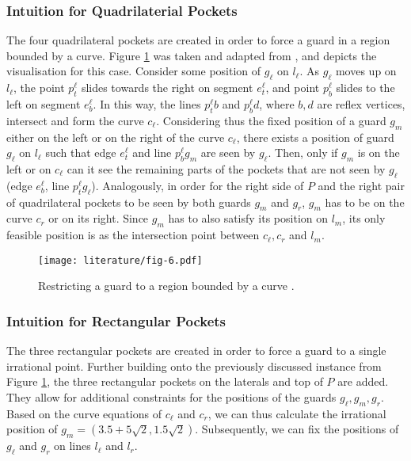\subsubsection{Intuition for Quadrilaterial Pockets}
The four quadrilateral pockets are created in order to force a guard in a region bounded by a curve. Figure \ref{fig:quadrilateral_pockets} was taken and adapted from \cite{1057165}, and depicts the visualisation for this case. 
Consider some position of $g_{\ell}$ on $l_{\ell}$. As $g_{\ell}$ moves up on $l_{\ell}$, the point $p^{\ell}_t$ slides towards the right on segment $e^{\ell}_t$, and point $p^{\ell}_b$ slides to the left on segment $e^{\ell}_b$. In this way, the lines $p^{\ell}_tb$ and $p^{\ell}_bd$, where $b, d$ are reflex vertices, intersect and form the curve $c_{\ell}$. Considering thus the fixed position of a guard $g_m$ either on the left or on the right of the curve $c_\ell$, there exists a position of guard $g_{\ell}$ on $l_{\ell}$ such that edge $e_t^{\ell}$ and line $p_b^{\ell}g_m$ are seen by $g_\ell$. Then, only if $g_m$ is on the left or on $c_\ell$ can it see the remaining parts of the pockets that are not seen by $g_\ell$ (edge $e_b^{\ell}$, line $p_t^{\ell}g_{\ell}$). Analogously, in order for the right side of $P$ and the right pair of quadrilateral pockets to be seen by both guards $g_m$ and $g_r$, $g_m$ has to be on the curve $c_r$ or on its right. Since $g_m$ has to also satisfy its position on $l_m$, its only feasible position is as the intersection point between $c_\ell, c_r$ and $l_m$. 

\begin{figure}[h!]
    \centering
    \texttt{[image: literature/fig-6.pdf]}
    \caption{Restricting a guard to a region bounded by a curve \cite{1057165}.}
    \label{fig:quadrilateral_pockets}
\end{figure}

\subsubsection{Intuition for Rectangular Pockets}
The three rectangular pockets are created in order to force a guard to a single irrational point. Further building onto the previously discussed instance from Figure \ref{fig:quadrilateral_pockets}, the three rectangular pockets on the laterals and top of $P$ are added.  They allow for additional constraints for the positions of the guards $g_\ell, g_m, g_r$. Based on the curve equations of $c_\ell$ and $c_r$, we can thus calculate the irrational position of $g_m = (3.5 + 5\sqrt 2, 1.5\sqrt 2)$. Subsequently, we can fix the positions of $g_\ell$ and $g_r$ on lines $l_\ell$ and $l_r$.

